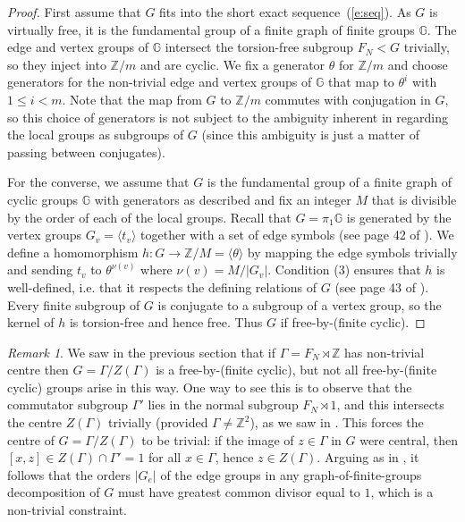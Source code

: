 \documentclass[11pt, a4 paper]{amsart}
\numberwithin{equation}{section}
\theoremstyle{remark}
\newtheorem{remark}[theorem]{Remark}
\theoremstyle{definition}
\def\Z{\mathbb Z}
\def\G{\Gamma}
\def\GG{\mathbb{G}}
\def\G{\Gamma}
\def\<{\langle}
\def\>{\rangle}
\begin{document}
\begin{proof} 
	First assume that 
	$G$ fits into the short exact sequence~(\ref{e:seq}). 
	As $G$ is virtually free, it is the fundamental group 
	of a finite graph of finite groups $\GG$. 
	The edge and vertex groups of $\GG$ 
	intersect the torsion-free subgroup $F_N<G$ trivially, 
	so they inject into $\Z/m$ and are cyclic. 
	We fix a generator $\theta$ for $\Z/m$ and choose generators 
	for the non-trivial edge and vertex groups of $\GG$ 
	that map to $\theta^i$ with $1\le i < m$. 
	Note that the map from $G$ to $\Z/m$ 
	commutes with conjugation in $G$, 
	so this choice of generators is not subject to the ambiguity 
	inherent in regarding the local groups as subgroups of $G$ 
	(since this ambiguity is just a matter of 
	passing between conjugates). 
	
	For the converse, we assume that 
	$G$ is the fundamental group of 
	a finite graph of cyclic groups $\GG$ 
	with generators as described and 
	fix an integer $M$ 
	that is divisible by the order of each of the local groups. 
	Recall that $G=\pi_1\GG$ is generated by 
	the vertex groups $G_v=\<t_v\>$ 
	together with a set of edge symbols 
	(see page 42 of \cite{serre1980trees}). 
	We define a homomorphism $h: G\to \Z/M=\<\theta\>$ 
	by mapping the edge symbols trivially 
	and sending $t_v$ to $\theta^{\nu(v)}$ where $\nu(v)=M/|G_v|$.  
	Condition (3) ensures that $h$ is well-defined, 
	i.e. that it respects the defining relations of $G$ 
	(see page 43 of \cite{serre1980trees}). 
	Every finite subgroup of $G$ 
	is conjugate to a subgroup of a vertex group, 
	so the kernel of $h$ is	torsion-free and hence free. 
	Thus $G$ if free-by-(finite cyclic). 
\end{proof}

\begin{remark}
\label{rmk:which_come_from_G/Z}
	We saw in the previous section that 
	if $\G=F_N\rtimes\Z$ has non-trivial centre
	then $G=\G/Z(\G)$ is a free-by-(finite cyclic), 
	but not all free-by-(finite cyclic) groups 
	arise in this way. 
	One way to see this is to observe that 
	the commutator subgroup $\G'$ 
	lies in the normal subgroup $F_N \rtimes 1$, 
	and this intersects the centre $Z(\G)$ trivially 
	(provided $\G\neq \Z^2$), 
	as we saw in . 
	This forces the centre of $G = \G/Z(\G)$ to be trivial: 
	if the image of $z\in\G$ in $G$ were central, 
	then $[x, z] \in Z(\G)\cap\G'=1$ for all $x \in \G$, 
	hence $z\in Z(\G)$. 
	Arguing as in , it follows that 
	the orders $|G_e|$ of the edge groups in any 
	graph-of-finite-groups decomposition of $G$ 
	must have greatest common divisor equal to $1$, 
	which is a non-trivial constraint. 
\end{remark}
\end{document}
